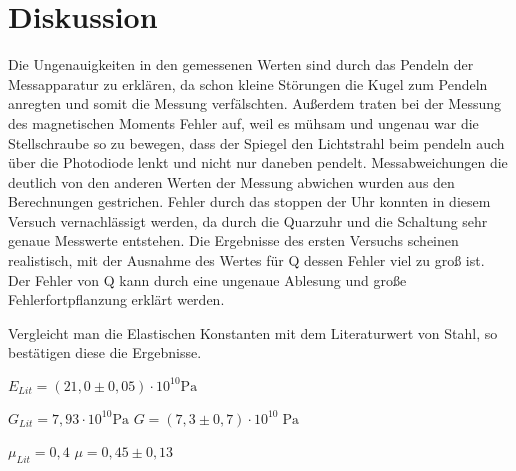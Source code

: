 \newpage
\section{Diskussion}
\label{sec:Diskussion}
Die Ungenauigkeiten in den gemessenen Werten sind durch das Pendeln der Messapparatur zu erklären,
 da schon kleine Störungen die Kugel zum Pendeln anregten und somit die Messung verfälschten.
Außerdem traten bei der Messung des magnetischen Moments Fehler auf,
 weil es mühsam und ungenau war die Stellschraube so zu bewegen,
  dass der Spiegel den Lichtstrahl beim pendeln auch über die Photodiode lenkt und nicht nur daneben pendelt.
Messabweichungen die deutlich von den anderen Werten der Messung abwichen wurden aus den Berechnungen gestrichen.
Fehler durch das stoppen der Uhr konnten in diesem Versuch vernachlässigt werden,
 da durch die Quarzuhr und die Schaltung sehr genaue Messwerte entstehen.
Die Ergebnisse des ersten Versuchs scheinen realistisch, mit der Ausnahme des Wertes für Q dessen Fehler viel zu groß ist.\\
Der Fehler von Q kann durch eine ungenaue Ablesung und große Fehlerfortpflanzung erklärt werden.

Vergleicht man die Elastischen Konstanten mit dem Literaturwert von Stahl, so bestätigen
diese die Ergebnisse.\newline

  $E_{Lit}=(21,0\pm 0,05)\cdot 10^{10}\textrm{Pa}$ \newline
  

  $G_{Lit}=7,93\cdot 10^{10}\textrm{Pa}$ \cite{lit_G}\newline
  $G = (7,3 \pm 0,7 )\cdot 10^{10}\;\mathrm{Pa}$\\\newline
  
  $\mu_{Lit}= 0,4$  \cite{lit_mu}\newline
  $\mu = 0,45 \pm 0,13$\newline
  
